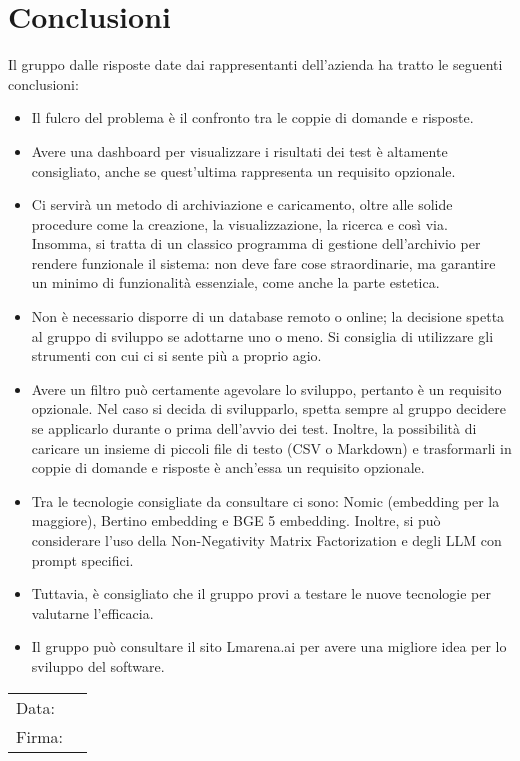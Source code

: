 \documentclass[a4paper, 12pt]{article}
\begin{document}
\section{Conclusioni}
Il gruppo dalle risposte date dai rappresentanti dell’azienda ha tratto le seguenti conclusioni:
\begin{itemize}
    \item Il fulcro del problema è il confronto tra le coppie di domande e risposte. 
    \item Avere una dashboard per visualizzare i risultati dei test è altamente consigliato, anche se quest’ultima rappresenta un requisito opzionale.
    \item Ci servirà un metodo di archiviazione e caricamento, oltre alle solide procedure come la creazione, la visualizzazione, la ricerca e così via. Insomma, si tratta di un classico programma di gestione dell’archivio per rendere funzionale il sistema: non deve fare cose straordinarie, ma garantire un minimo di funzionalità essenziale, come anche la parte estetica.
    \item Non è necessario disporre di un database remoto o online; la decisione spetta al gruppo di sviluppo se adottarne uno o meno. Si consiglia di utilizzare gli strumenti con cui ci si sente più a proprio agio.
    \item Avere un filtro può certamente agevolare lo sviluppo, pertanto è un requisito opzionale. Nel caso si decida di svilupparlo, spetta sempre al gruppo decidere se applicarlo durante o prima dell'avvio dei test. Inoltre, la possibilità di caricare un insieme di piccoli file di testo (CSV o Markdown) e trasformarli in coppie di domande e risposte è anch'essa un requisito opzionale.
    \item Tra le tecnologie consigliate da consultare ci sono: Nomic (embedding per la maggiore), Bertino embedding e BGE 5 embedding. Inoltre, si può considerare l'uso della Non-Negativity Matrix Factorization e degli LLM con prompt specifici. 
    \item Tuttavia, è consigliato che il gruppo provi a testare le nuove tecnologie per valutarne l'efficacia.
    \item Il gruppo può consultare il sito Lmarena.ai per avere una migliore idea per lo sviluppo del software.
\end{itemize}
\vfill
{\renewcommand{\arraystretch}{2}
\begin{tabular}{l p{5cm}}
    Data: &  \hrulefill \\
    Firma: & \hrulefill \\
\end{tabular}
}
\end{document}

